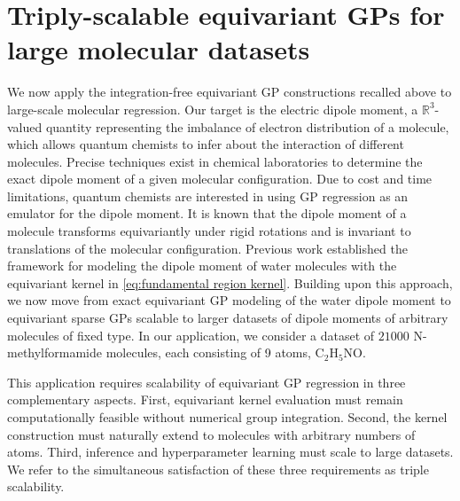 \documentclass[11pt,a4paper]{article}
\begin{document}
\section{Triply-scalable equivariant GPs for large molecular datasets}
\label{sec:triply-scalable}
We now apply the integration-free equivariant GP constructions recalled above to large-scale molecular regression. Our target is the electric dipole moment, a $\mathbb{R}^3$-valued quantity representing the imbalance of electron distribution of a molecule, which allows quantum chemists to infer about the interaction of different molecules. Precise techniques exist in chemical laboratories to determine the exact dipole moment of a given molecular configuration. Due to cost and time limitations, quantum chemists are interested in using GP regression as an emulator for the dipole moment. It is known that the dipole moment of a molecule transforms equivariantly under rigid rotations and is invariant to translations of the molecular configuration. Previous work \citep{steinertintegration} established the framework for modeling the dipole moment of water molecules with the equivariant kernel in \eqref{eq:fundamental region kernel}. Building upon this approach, we now move from exact equivariant GP modeling of the water dipole moment to equivariant sparse GPs scalable to larger datasets of dipole moments of arbitrary molecules of fixed type. In our application, we consider a dataset of $21000$ N-methylformamide molecules, each consisting of 9 atoms, $\mathrm{C_2H_5NO}$.


This application requires scalability of equivariant GP regression %
in three complementary aspects. First, equivariant kernel evaluation must remain computationally feasible without numerical group integration. Second, the kernel construction must naturally extend to molecules with arbitrary numbers of atoms. Third, inference and hyperparameter learning must scale to large datasets. We refer to the simultaneous satisfaction of these three requirements as triple scalability.
\end{document}
